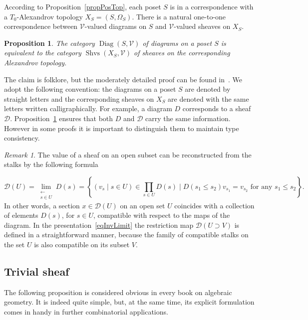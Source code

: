 \documentclass[english,12pt,oneside]{amsproc}
\DeclareMathOperator{\Diag}{Diag}
\DeclareMathOperator{\Shvs}{Shvs}
\newcommand{\ca}[1]{\mathcal{#1}}
\newcommand{\Vv}{\mathcal{V}}
\newcounter{stmcounter}[section]
\numberwithin{equation}{section}
\theoremstyle{plain}
\newtheorem{prop}[stmcounter]{Proposition}
\theoremstyle{definition}
\theoremstyle{remark}
\newtheorem{rem}[stmcounter]{Remark}
\begin{document}
According to Proposition~\ref{propPosTop}, each poset $S$ is in a correspondence with a $T_0$-Alexandrov topology $X_S=(S,\Omega_S)$. There is a natural one-to-one correspondence between $\Vv$-valued diagrams on $S$ and $\Vv$-valued sheaves on $X_S$.

\begin{prop}\label{propDiagSheaf}
The category $\Diag(S,\Vv)$ of diagrams on a poset $S$ is equivalent to the category $\Shvs(X_S,\Vv)$ of sheaves on the corresponding Alexandrov topology.
\end{prop}

The claim is folklore, but the moderately detailed proof can be found in~\cite{AyzSheaves}. We adopt the following convention: the diagrams on a poset $S$ are denoted by straight letters and the corresponding sheaves on $X_S$ are denoted with the same letters written calligraphically. For example, a diagram $D$ corresponds to a sheaf $\ca{D}$. Proposition~\ref{propDiagSheaf} ensures that both $D$ and $\ca{D}$ carry the same information. However in some proofs it is important to distinguish them to maintain type consistency.

\begin{rem} \label{remConcreteLimSets}
The value of a sheaf on an open subset can be reconstructed from the stalks by the following formula

\begin{equation}\label{eqInvLimit}
\ca{D}(U)=\lim\limits_{\substack{\leftarrow \\ s\in U}}D(s)=\left\{(v_s\mid s\in U)\in\prod_{s\in U}D(s)\mid D(s_1\leqslant s_2)v_{s_1}=v_{s_2} \text{ for any }s_1\leqslant s_2 \right\}.
\end{equation}
In other words, a section $x\in \ca{D}(U)$ on an open set $U$ coincides with a collection of elements $D(s)$, for $s\in U$, compatible with respect to the maps of the diagram. In the presentation~\eqref{eqInvLimit} the restriction map $\ca{D}(U\supset V)$ is defined in a straightforward manner, because the family of compatible stalks on the set $U$ is also compatible on its subset $V$.
\end{rem}

\subsection{Trivial sheaf}

The following proposition is considered obvious in every book on algebraic geometry. It is indeed quite simple, but, at the same time, its explicit formulation comes in handy in further combinatorial applications.
\end{document}
